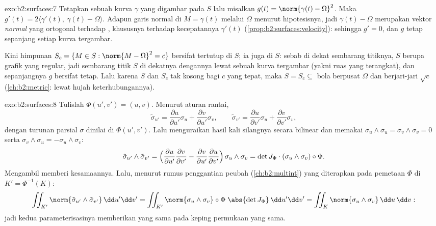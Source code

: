 \begin{solution}{exo:b2:surfaces:7}
Tetapkan sebuah kurva $\gamma$ yang digambar pada $S$ lalu misalkan $g(t) = \norm{\gamma(t)
- \Omega}^2$. Maka $g'(t) = 2\langle \gamma'(t),\ \gamma(t) -
\Omega\rangle$. Adapun garis normal di $M = \gamma(t)$ melalui
$\Omega$ menurut hipotesisnya, jadi $\gamma(t) - \Omega$ merupakan vektor
\emph{normal} yang ortogonal terhadap , khususnya terhadap
kecepatannya $\gamma'(t)$ (\cref{prop:b2:surfaces:velocity}): sehingga $g' =
0$, dan $g$ tetap sepanjang setiap kurva tergambar.

Kini himpunan $S_c = \{M \in S : \norm{M - \Omega}^2 = c\}$ bersifat
tertutup di $S$; ia juga  di $S$: sebab di dekat sembarang titiknya, $S$
berupa grafik yang regular, jadi sembarang titik $S$ di dekatnya  dengannya lewat
sebuah kurva tergambar (yakni ruas yang terangkat), dan sepanjangnya $g$ bersifat tetap. Lalu karena
$S$  dan $S_c$ tak kosong bagi $c$ yang tepat, maka $S = S_c
\subseteq$ bola berpusat $\Omega$ dan berjari-jari $\sqrt c$
(\cref{ch:b2:metric}: lewat hujah keterhubungannya).
\end{solution}

\begin{solution}{exo:b2:surfaces:8}
Tulislah $\Phi(u', v') = (u, v)$. Menurut aturan rantai,
\[
\tilde\sigma_{u'} = \frac{\partial u}{\partial u'}\sigma_u
+ \frac{\partial v}{\partial u'}\sigma_v,
\qquad
\tilde\sigma_{v'} = \frac{\partial u}{\partial v'}\sigma_u
+ \frac{\partial v}{\partial v'}\sigma_v ,
\]
dengan turunan parsial $\sigma$ dinilai di $\Phi(u',v')$. Lalu menguraikan
hasil kali silangnya secara bilinear dan memakai $\sigma_u \wedge \sigma_u =
\sigma_v \wedge \sigma_v = 0$ serta $\sigma_v \wedge \sigma_u =
-\sigma_u \wedge \sigma_v$:
\[
\tilde\sigma_{u'} \wedge \tilde\sigma_{v'}
= \Bigl(\frac{\partial u}{\partial u'}
\frac{\partial v}{\partial v'}
- \frac{\partial v}{\partial u'}
\frac{\partial u}{\partial v'}\Bigr)\,
\sigma_u \wedge \sigma_v
= \det J_\Phi \cdot (\sigma_u \wedge \sigma_v)\circ\Phi .
\]
Mengambil  memberi kesamaannya. Lalu, menurut rumus penggantian
peubah (\cref{ch:b2:multint}) yang diterapkan pada pemetaan $\Phi$ di $K' =
\Phi^{-1}(K)$:
\[
\iint_{K'} \norm{\tilde\sigma_{u'} \wedge \tilde\sigma_{v'}}
\,\dd u'\dd v'
= \iint_{K'} \norm{\sigma_u \wedge \sigma_v}\circ\Phi\;
\abs{\det J_\Phi}\,\dd u'\dd v'
= \iint_K \norm{\sigma_u \wedge \sigma_v}\,\dd u\,\dd v :
\]
jadi kedua parameterisasinya memberikan  yang sama pada keping permukaan
yang sama.
\end{solution}


